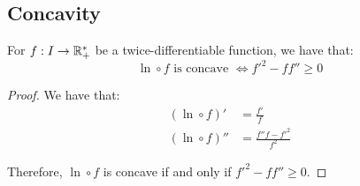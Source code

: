 \subsection{Concavity}

\begin{lemma}
    \label{lemma:concavity_log_composed_functions}
    For $f: I \rightarrow \mathbb{R}_+^*$ be a twice-differentiable function, we have that:
    \[ \ln \circ f \text{ is concave } \iff  f'^2 - f f'' \geq 0 \]
\end{lemma}
\begin{proof}
    We have that:
    \begin{align}
        (\ln \circ f)' &= \frac{f'}{f}\\
        (\ln \circ f)'' &= \frac{f''f - f'^2}{f^2}
    \end{align}
    
    Therefore, $\ln \circ f$ is concave if and only if $f'^2 - f f'' \geq 0$.
\end{proof}
